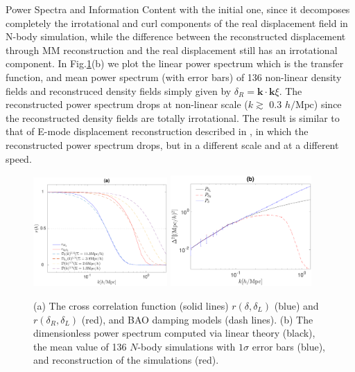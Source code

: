 \begin{section}{Power Spectra and Information Content}
with the initial one, since it decomposes completely the irrotational and curl components of the real displacement 
field in N-body simulation, while the difference between the reconstructed displacement through MM reconstruction 
and the real displacement still has an irrotational component.
 In Fig.\ref{fig:cross-correlation-power}(b) we plot the linear power spectrum which is the transfer function, and mean 
power spectrum (with error bars) of 136 non-linear density fields and reconstruced density fields simply 
given by $\delta_R=\bm{k}\cdot\bm{k}\xi$. The reconstructed power spectrum drops at non-linear scale ($k \gtrsim$ 0.3 $h/\mathrm{Mpc}$) 
since the reconstructed density fields are totally irrotational. The result is similar to that of 
E-mode displacement reconstruction described in \cite{bib:Yu2016}, in which the reconstructed power spectrum 
drops, but in a different scale and at a different speed.
\begin{figure}
\centering
\includegraphics[width=0.455\textwidth]{cross_correlation_best_analysis-crop.pdf} 
\includegraphics[width=0.48\textwidth]{power_best_analysis-crop.pdf}
\caption{(a) The cross correlation function (solid lines) $r(\delta,\delta_L)$ (blue) and $r(\delta_R,\delta_L)$ (red), 
and BAO damping models (dash lines). 
(b) The dimensionless power spectrum computed via linear theory (black), the mean value of 136 $N$-body simulations
with $1\sigma$ error bars (blue), and reconstruction of the simulations (red).}
\label{fig:cross-correlation-power}
\end{figure}


\end{section}
